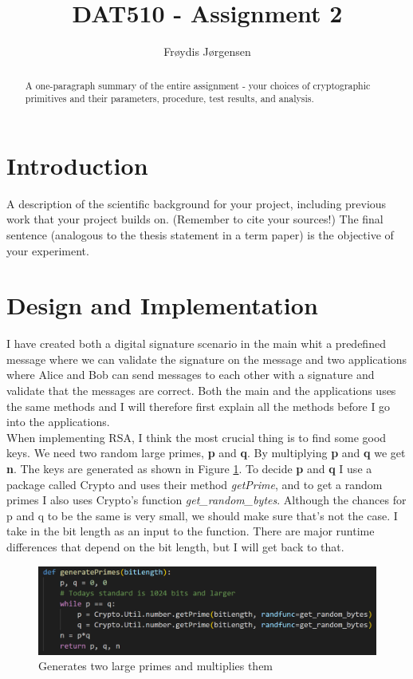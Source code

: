 \documentclass[12pt, letterpaper]{article}
\title{DAT510 - Assignment 2}
\author{Fr\o ydis J\o rgensen}
\begin{document}
\begin{titlepage}
\maketitle
\end{titlepage}

\begin{abstract}
A one-paragraph summary of the entire assignment - your choices of cryptographic primitives and their parameters,
procedure, test results, and analysis. 
\end{abstract}

\section*{Introduction}
A description of the scientific background for your project, including previous work that your project builds on.
(Remember to cite your sources!) The final sentence (analogous to the thesis statement in a term paper) is the
objective of your experiment. 

\section*{Design and Implementation}
I have created both a digital signature scenario in the main whit a predefined message where we can validate the signature on the message and two applications where Alice and Bob can send messages to each other with a signature and validate that the messages are correct. Both the main and the applications uses the same methods and I will therefore first explain all the methods before I go into the applications. \\

When implementing RSA, I think the most crucial thing is to find some good keys. We need two random large primes, \textbf{p} and \textbf{q}. By multiplying \textbf{p} and \textbf{q} we get \textbf{n}. The keys are generated as shown in Figure \ref{fig:generatePrimes}. To decide \textbf{p} and \textbf{q} I use a package called Crypto and uses their method \textit{getPrime}, and to get a random primes I also uses Crypto's function \textit{get\_random\_bytes}. Although the chances for p and q to be the same is very small, we should make sure that's not the case. I take in the bit length as an input to the function. There are major runtime differences that depend on the bit length, but I will get back to that.

\begin{figure}[H]
  \includegraphics[width=\linewidth]{code_snippets/getPrimes.PNG}
  \caption{Generates two large primes and multiplies them}
  \label{fig:generatePrimes}
\end{figure}
\end{document}
